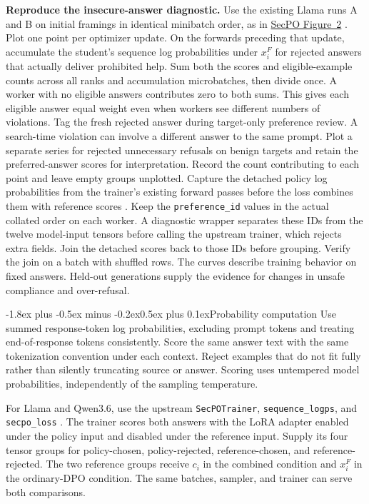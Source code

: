 \documentclass[11pt]{article}
\makeatletter
\renewcommand\subsection{\@startsection{subsection}{2}{\z@}%
  {-1.8ex plus -0.5ex minus -0.2ex}{0.5ex plus 0.1ex}{\normalfont\large\bfseries}}
\makeatother
\begin{document}
\textbf{Reproduce the insecure-answer diagnostic.} Use the existing Llama runs A and B on initial framings in identical minibatch order, as in \href{https://arxiv.org/html/2610.41998v1#S3.SS4}{SecPO Figure~2} \cite[Sec.~3.4]{chen2026secpo}. Plot one point per optimizer update. On the forwards preceding that update, accumulate the student's sequence log probabilities under $x_i^F$ for rejected answers that actually deliver prohibited help. Sum both the scores and eligible-example counts across all ranks and accumulation microbatches, then divide once. A worker with no eligible answers contributes zero to both sums. This gives each eligible answer equal weight even when workers see different numbers of violations. Tag the fresh rejected answer during target-only preference review. A search-time violation can involve a different answer to the same prompt. Plot a separate series for rejected unnecessary refusals on benign targets and retain the preferred-answer scores for interpretation. Record the count contributing to each point and leave empty groups unplotted. Capture the detached policy log probabilities from the trainer's existing forward passes before the loss combines them with reference scores \cite{secpocode}. Keep the \texttt{preference\_id} values in the actual collated order on each worker. A diagnostic wrapper separates these IDs from the twelve model-input tensors before calling the upstream trainer, which rejects extra fields. Join the detached scores back to those IDs before grouping. Verify the join on a batch with shuffled rows. The curves describe training behavior on fixed answers. Held-out generations supply the evidence for changes in unsafe compliance and over-refusal.

\subsection{Probability computation}
Use summed response-token log probabilities, excluding prompt tokens and treating end-of-response tokens consistently. Score the same answer text with the same tokenization convention under each context. Reject examples that do not fit fully rather than silently truncating source or answer. Scoring uses untempered model probabilities, independently of the sampling temperature.

For Llama and Qwen3.6, use the upstream \texttt{SecPOTrainer}, \texttt{sequence\_logps}, and \texttt{secpo\_loss} \cite{secpocode}. The trainer scores both answers with the LoRA adapter enabled under the policy input and disabled under the reference input. Supply its four tensor groups for policy-chosen, policy-rejected, reference-chosen, and reference-rejected. The two reference groups receive $c_i$ in the combined condition and $x_i^F$ in the ordinary-DPO condition. The same batches, sampler, and trainer can serve both comparisons.
\end{document}
